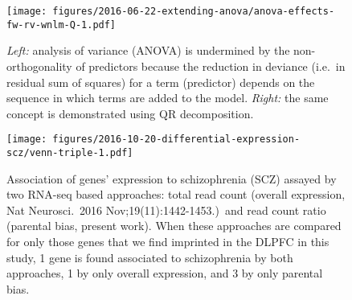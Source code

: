 \documentclass[letterpaper]{article}
\begin{document}
\begin{figure}
\begin{center}
\texttt{[image: figures/2016-06-22-extending-anova/anova-effects-fw-rv-wnlm-Q-1.pdf]}
\end{center}
\caption{
\emph{Left:} analysis of variance (ANOVA) is undermined by the non-orthogonality of
predictors because the reduction in deviance (i.e.~in residual sum of squares)
for a term (predictor) depends on the sequence in which terms are added to the
model.  \emph{Right:} the same concept is demonstrated using QR decomposition.
}
\label{fig:anova}
\end{figure}

\begin{figure}
\begin{center}
\texttt{[image: figures/2016-10-20-differential-expression-scz/venn-triple-1.pdf]}
\end{center}
\caption{
Association of genes' expression to schizophrenia (SCZ) assayed by two RNA-seq
based approaches: total read count (overall expression, Nat Neurosci.~2016
Nov;19(11):1442-1453.)~and read count ratio
(parental bias, present work).  When these approaches are compared for only
those genes that we find imprinted in the DLPFC in this study, 1 gene is found
associated to schizophrenia by both approaches, 1 by only overall expression,
and 3 by only parental bias.
}
\label{fig:diff-exp-scz}
\end{figure}



\setcounter{table}{0}
\makeatletter 
\renewcommand{\thetable}{S\@arabic\c@table}
\makeatother
\end{document}
